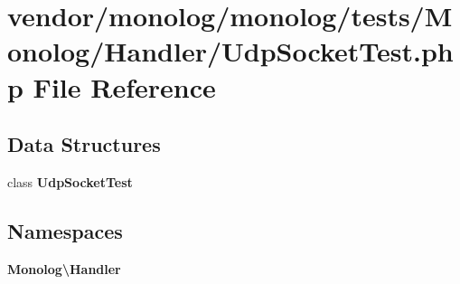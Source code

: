 \section{vendor/monolog/monolog/tests/\+Monolog/\+Handler/\+Udp\+Socket\+Test.php File Reference}
\label{_udp_socket_test_8php}
\subsection*{Data Structures}
\begin{DoxyCompactItemize}
\item 
class {\bf Udp\+Socket\+Test}
\end{DoxyCompactItemize}
\subsection*{Namespaces}
\begin{DoxyCompactItemize}
\item 
 {\bf Monolog\textbackslash{}\+Handler}
\end{DoxyCompactItemize}

